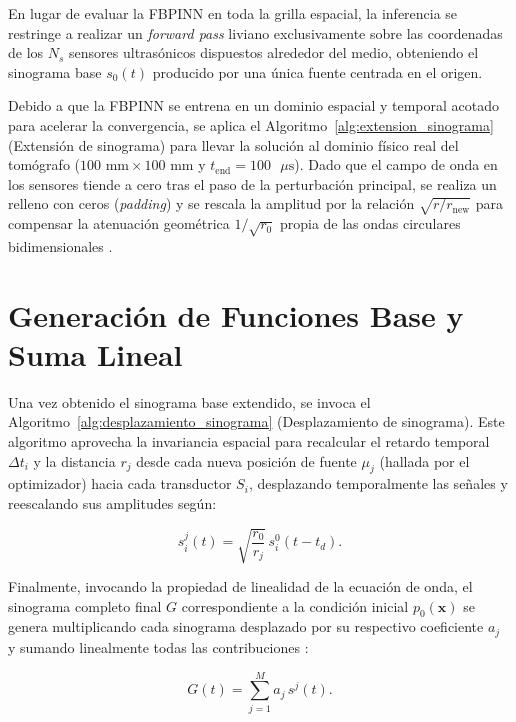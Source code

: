 En lugar de evaluar la FBPINN en toda la grilla espacial, la inferencia se restringe a realizar un \textit{forward pass} liviano exclusivamente sobre las coordenadas de los $N_s$ sensores ultrasónicos dispuestos alrededor del medio, obteniendo el sinograma base $s_0(t)$ producido por una única fuente centrada en el origen.

Debido a que la FBPINN se entrena en un dominio espacial y temporal acotado para acelerar la convergencia, se aplica el Algoritmo~\ref{alg:extension_sinograma} (Extensión de sinograma) para llevar la solución al dominio físico real del tomógrafo ($100\text{ mm} \times 100\text{ mm}$ y $t_{\text{end}} = 100\text{ }\mu\text{s}$). Dado que el campo de onda en los sensores tiende a cero tras el paso de la perturbación principal, se realiza un relleno con ceros (\textit{padding}) y se rescala la amplitud por la relación $\sqrt{r / r_{\text{new}}}$ para compensar la atenuación geométrica $1/\sqrt{r_0}$ propia de las ondas circulares bidimensionales .

\section{Generación de Funciones Base y Suma Lineal}

Una vez obtenido el sinograma base extendido, se invoca el Algoritmo~\ref{alg:desplazamiento_sinograma} (Desplazamiento de sinograma). Este algoritmo aprovecha la invariancia espacial para recalcular el retardo temporal $\Delta t_i$ y la distancia $r_j$ desde cada nueva posición de fuente $\mu_j$ (hallada por el optimizador) hacia cada transductor $S_i$, desplazando temporalmente las señales y reescalando sus amplitudes según:

\begin{equation}
    s_i^j(t) = \sqrt{\frac{r_0}{r_j}} \, s_i^0(t - t_d).
    \label{eq:relacion_sinogramas}
\end{equation}

Finalmente, invocando la propiedad de linealidad de la ecuación de onda, el sinograma completo final $G$ correspondiente a la condición inicial $p_0(\mathbf{x})$ se genera multiplicando cada sinograma desplazado por su respectivo coeficiente $a_j$ y sumando linealmente todas las contribuciones \cite{87, 107, 128}:

\begin{equation}
    G(t) = \sum_{j=1}^M a_j \, s^j(t).
    \label{eq:suma_sinogramas_lineal}
\end{equation}

